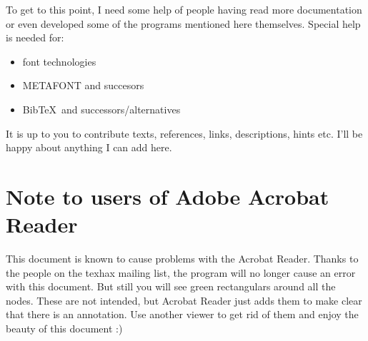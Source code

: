 \documentclass{scrartcl}
\begin{document}
To get to this point, I need some help of people having read more documentation or even developed some of the programs mentioned here themselves. Special help is needed for:
\begin{itemize}
\item font technologies
\item METAFONT and succesors
\item Bib\TeX\ and successors/alternatives
\end{itemize}

It is up to you to contribute texts, references, links, descriptions, hints etc. I'll be happy about anything I can add here.

\section*{Note to users of Adobe Acrobat Reader}
This document is known to cause problems with the Acrobat Reader. Thanks to the people on the texhax mailing list, the program will no longer cause an error with this document. But still you will see green rectangulars around all the nodes. These are not intended, but Acrobat Reader just adds them to make clear that there is an annotation. Use another viewer to get rid of them and enjoy the beauty of this document :)

\clearpage
\tableofcontents
\clearpage
\end{document}
